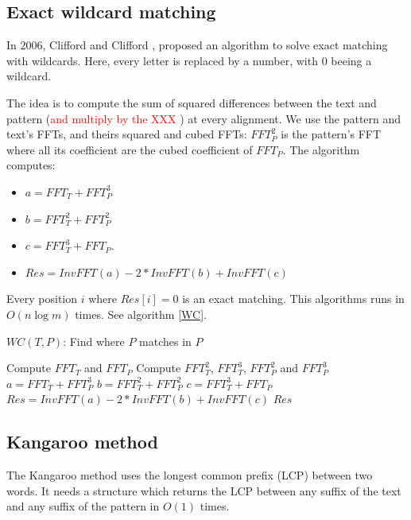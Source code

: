 \documentclass[preprint,12pt]{elsarticle}
\begin{document}
\subsection{Exact wildcard matching}

In $2006$, Clifford and Clifford \cite{WC}, proposed an algorithm to solve
exact matching with wildcards.
Here, every letter is replaced by a number, with $0$ beeing a wildcard.

The idea is to compute the sum of squared differences between the text and pattern
(\textcolor{red}{and multiply by the XXX} ) at every alignment.
We use the pattern and text's FFTs, and theirs squared and cubed FFTs:
$FFT^2_P$ is the pattern's FFT where all its coefficient are the cubed coefficient of $FFT_P$.
The algorithm computes: 
\begin{itemize}
\setlength\itemsep{0.1em}
\item $a = FFT_T+ FFT^3_P$
\item $b = FFT^2_T+ FFT^2_P$
\item $c = FFT^3_T+ FFT_P$.
\item $Res = InvFFT(a) - 2*InvFFT(b) + InvFFT(c)$
\end{itemize}

Every position $i$ where $Res[i] = 0$ is an exact matching.
This algorithms runs in $O(n \log m)$ times. See algorithm \ref{WC}.



\begin{algorithm}
\label{WC}
\caption{$WC(T, P)$: Find where $P$ matches in $P$}
\begin{algorithmic}

\STATE Compute $FFT_T$ and $FFT_P$
\STATE Compute $FFT^2_T$, $FFT^3_T$, $FFT^2_P$ and $FFT^3_P$ 
\STATE $a = FFT_T+ FFT^3_P$
\STATE $b = FFT^2_T+ FFT^2_P$
\STATE $c = FFT^3_T+ FFT_P$
\STATE $Res = InvFFT(a) - 2*InvFFT(b) + InvFFT(c)$
\RETURN $Res$

\end{algorithmic}
\end{algorithm}


\subsection{Kangaroo method}

The Kangaroo method uses the longest common prefix (LCP) between two words.
It needs a structure which returns the LCP between any suffix of the text and any suffix of the pattern
in $O(1)$ times.
\end{document}
